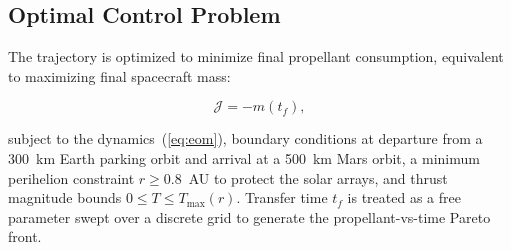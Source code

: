 \subsection{Optimal Control Problem}

The trajectory is optimized to minimize final propellant consumption, equivalent
to maximizing final spacecraft mass:

\begin{equation}
  \mathcal{J} = -m(t_f),
  \label{eq:cost}
\end{equation}

subject to the dynamics~(\ref{eq:eom}), boundary conditions at departure from
a 300~km Earth parking orbit and arrival at a 500~km Mars orbit, a minimum
perihelion constraint $r \geq 0.8$~AU to protect the solar arrays, and thrust
magnitude bounds $0 \leq T \leq T_{\max}(r)$.  Transfer time $t_f$ is treated
as a free parameter swept over a discrete grid to generate the propellant-vs-time
Pareto front.


